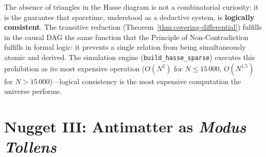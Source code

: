 \begin{result}[title={The Geometry of Spacetime Obeys Classical
Logic}]
\label{res:stone-non-contradiction}
The absence of triangles in the Hasse diagram is not a
combinatorial curiosity: it is the guarantee that spacetime,
understood as a deductive system, is \textbf{logically
consistent}. The transitive reduction
(Theorem~\ref{thm:covering-differential}) fulfills in the causal DAG the
same function that the Principle of Non-Contradiction fulfills in
formal logic: it prevents a single relation from being
simultaneously atomic and derived. The simulation engine
(\texttt{build\_hasse\_sparse}) executes this prohibition as its
most expensive operation ($O(N^2)$ for $N \leq 15\,000$,
$O(N^{1.5})$ for $N > 15\,000$)---logical consistency is the
most expensive computation the universe performs.
\end{result}

\section{Nugget III: Antimatter as \emph{Modus Tollens}}

